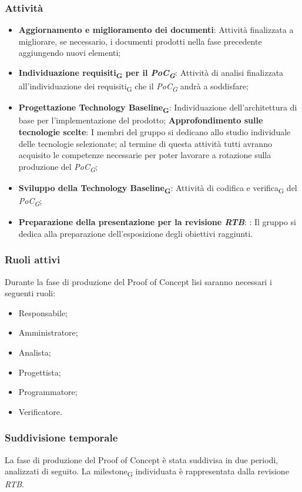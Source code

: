 \subsubsection{Attività}\:
\begin{itemize}
	\item \textbf{Aggiornamento e miglioramento dei documenti}: Attività finalizzata a migliorare, se necessario, i documenti prodotti nella fase precedente aggiungendo nuovi elementi;
	\item \textbf{Individuazione requisiti\textsubscript{G} per il \textit{PoC\textsubscript{G}}}: Attività di analisi finalizzata all’individuazione dei requisiti\textsubscript{G} che il \textit{PoC\textsubscript{G}} andrà a soddisfare;
    \item \textbf{Progettazione Technology Baseline\textsubscript{G}}: Individuazione dell’architettura di base per l’implementazione del prodotto;
        \subitem \textbf{Approfondimento sulle tecnologie scelte}: I membri del gruppo si dedicano allo studio individuale delle tecnologie selezionate; al termine di questa attività tutti avranno acquisito le competenze necessarie per poter lavorare a rotazione sulla produzione del \textit{PoC\textsubscript{G}};
    \item \textbf{Sviluppo della Technology Baseline\textsubscript{G}}: Attività di codifica e verifica\textsubscript{G} del \textit{PoC\textsubscript{G}};
    \item \textbf{Preparazione della presentazione per la revisione \textit{RTB}}: : Il gruppo si dedica alla preparazione dell’esposizione degli obiettivi raggiunti.
\end{itemize}

\subsubsection{Ruoli attivi}
Durante la fase di produzione del Proof of Concept lisi saranno necessari i seguenti ruoli:
\begin{itemize}
	\item Responsabile;
    \item Amministratore;
    \item Analista;
    \item Progettista;
    \item Programmatore;
    \item Verificatore.
\end{itemize}

\subsubsection{Suddivisione temporale}
La fase di produzione del Proof of Concept è stata suddivisa in due periodi, analizzati di seguito. La milestone\textsubscript{G} individuata è rappresentata dalla revisione \textit{RTB}.

